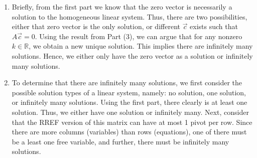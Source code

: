 \begin{SaveQuestion}
\begin{enumerate}
        \item Briefly, from the first part we know that the zero vector is necessarily a solution to the homogeneous linear system. Thus, there are two possibilities, either that zero vector is the only solution, or different $\vec c$ exists such that $A\vec c = 0$. Using the result from Part (3), we can argue that for any nonzero $k \in \mathbb{R}$, we obtain a new unique solution. This implies there are infinitely many solutions. Hence, we either only have the zero vector as a solution or infinitely many solutions. 
        
        \item To determine that there are infinitely many solutions, we first consider the possible solution types of a linear system, namely: no solution, one solution, or infinitely many solutions. Using the first part, there clearly is at least one solution. Thus, we either have one solution or infinitely many. Next, consider that the RREF version of this matrix can have at most 1 pivot per row. Since there are more columns (variables) than rows (equations), one of there must be a least one free variable, and further, there must be infinitely many solutions.  
	\end{enumerate}
\end{SaveQuestion}


